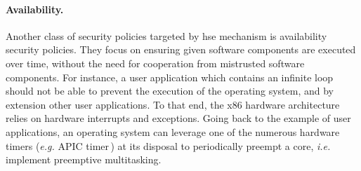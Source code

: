 \paragraph{Availability.}
%
Another class of security policies targeted by \ac{hse} mechanism is
availability security policies.
%
They focus on ensuring given software components are executed over time, without
the need for cooperation from mistrusted software components.
%
For instance, a user application which contains an infinite loop should not be
able to prevent the execution of the operating system, and by extension other
user applications.
%
To that end, the x86 hardware architecture relies on hardware interrupts and
exceptions.
%
Going back to the example of user applications, an operating system can leverage
one of the numerous hardware timers (\emph{e.g.} APIC timer\,\cite[Volume 3,
Subsection 10.5.4]{intel2014manual}) at its disposal to periodically preempt a
core, \emph{i.e.} implement preemptive multitasking.

%
%
%

